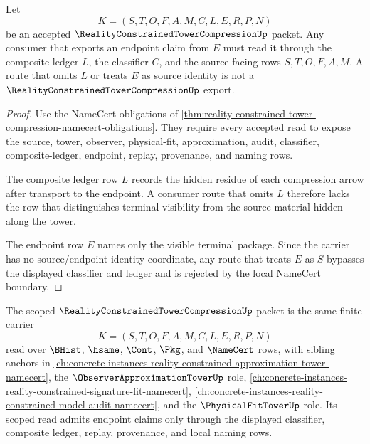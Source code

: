 \begin{theorem}
\label{thm:reality-constrained-tower-compression-ledger-nonescape}
Let
$$
K=(S,T,O,F,A,M,C,L,E,R,P,N)
$$
be an accepted $\RealityConstrainedTowerCompressionUp$ packet. Any consumer that exports an endpoint claim from $E$ must read it through the composite ledger $L$, the classifier $C$, and the source-facing rows $S,T,O,F,A,M$. A route that omits $L$ or treats $E$ as source identity is not a $\RealityConstrainedTowerCompressionUp$ export.
\end{theorem}
\begin{proof}
Use the NameCert obligations of \autoref{thm:reality-constrained-tower-compression-namecert-obligations}. They require every accepted read to expose the source, tower, observer, physical-fit, approximation, audit, classifier, composite-ledger, endpoint, replay, provenance, and naming rows.

The composite ledger row $L$ records the hidden residue of each compression arrow after transport to the endpoint. A consumer route that omits $L$ therefore lacks the row that distinguishes terminal visibility from the source material hidden along the tower.

The endpoint row $E$ names only the visible terminal package. Since the carrier has no source/endpoint identity coordinate, any route that treats $E$ as $S$ bypasses the displayed classifier and ledger and is rejected by the local NameCert boundary.
\end{proof}

\begin{definition}
\label{def:reality-constrained-tower-compression-scoped-packet}
The scoped $\RealityConstrainedTowerCompressionUp$ packet is the same finite carrier
$$
K=(S,T,O,F,A,M,C,L,E,R,P,N)
$$
read over $\BHist$, $\hsame$, $\Cont$, $\Pkg$, and $\NameCert$ rows, with sibling anchors in \autoref{ch:concrete-instances-reality-constrained-approximation-tower-namecert}, the $\ObserverApproximationTowerUp$ role, \autoref{ch:concrete-instances-reality-constrained-signature-fit-namecert}, \autoref{ch:concrete-instances-reality-constrained-model-audit-namecert}, and the $\PhysicalFitTowerUp$ role. Its scoped read admits endpoint claims only through the displayed classifier, composite ledger, replay, provenance, and local naming rows.
\end{definition}

